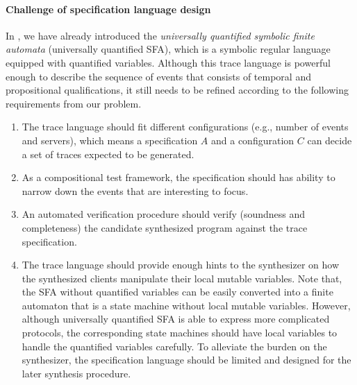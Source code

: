 \paragraph{Challenge of specification language design} In , we have already introduced the \emph{universally quantified symbolic finite automata} (universally quantified SFA), which is a symbolic regular language equipped with quantified variables. Although this trace language is powerful enough to describe the sequence of events that consists of temporal and propositional qualifications, it still needs to be refined according to the following requirements from our problem.
\begin{enumerate}
    \item The trace language should fit different configurations (e.g., number of events and servers), which means a specification $A$ and a configuration $C$ can decide a set of traces expected to be generated.
    \item As a compositional test framework, the specification should has ability to narrow down the events that are interesting to focus.
    \item An automated verification procedure should verify (soundness and completeness) the candidate synthesized program against the trace specification.
    \item The trace language should provide enough hints to the synthesizer on how the synthesized clients manipulate their local mutable variables. Note that, the SFA without quantified variables can be easily converted into a finite automaton that is a state machine without local mutable variables. However, although universally quantified SFA is able to express more complicated protocols, the corresponding state machines should have local variables to handle the quantified variables carefully. To alleviate the burden on the synthesizer, the specification language should be limited and designed for the later synthesis procedure.
\end{enumerate}


